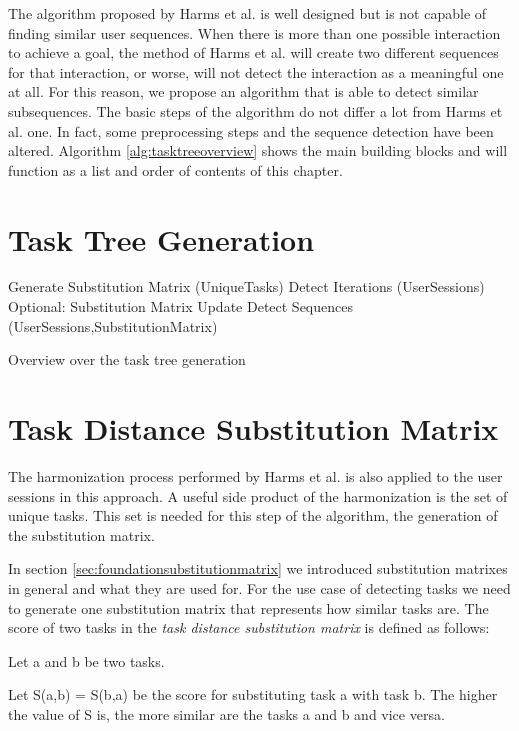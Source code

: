 The algorithm proposed by Harms et al. is well designed but is not capable of finding similar user sequences.
When there is more than one possible interaction to achieve a goal, the method of Harms et al. will create two different sequences for that interaction,
or worse, will not detect the interaction as a meaningful one at all. For this reason, we propose an algorithm that is able to detect similar subsequences.
The basic steps of the algorithm do not differ a lot from Harms et al. one. In fact, some preprocessing steps and the sequence detection have been altered.
Algorithm \ref{alg:tasktreeoverview} shows the main building blocks and will function as a list and order of contents of this chapter.
\section{Task Tree Generation}

\begin{algorithm}[h]
\begin{algorithmic}
	\State Generate Substitution Matrix (UniqueTasks)
	\State Detect Iterations (UserSessions)
	\State Optional: Substitution Matrix Update
	\State Detect Sequences (UserSessions,SubstitutionMatrix)
	\EndWhile
	\EndProcedure
\end{algorithmic}
\caption{Overview over the task tree generation}
\label{alg:tasktreeoverview}
\end{algorithm}
\section{Task Distance Substitution Matrix}
The harmonization process performed by Harms et al. is also applied to the user sessions in this approach.
A useful side product of the harmonization is the set of unique tasks.
This set is needed for this step of the algorithm, the generation of the substitution matrix.

In section \ref{sec:foundationsubstitutionmatrix} we introduced substitution matrixes in general and what they are used for.
For the use case of detecting tasks we need to generate one substitution matrix that represents how similar tasks are.
The score of two tasks in the \textit{task distance substitution matrix} is defined as follows:
\begin{definition}
	\item Let a and b be two tasks.
	\item Let S(a,b) = S(b,a) be the score for substituting task a with task b. The higher the value of S is, the more similar are the tasks a and b and vice versa.
\end{definition}

